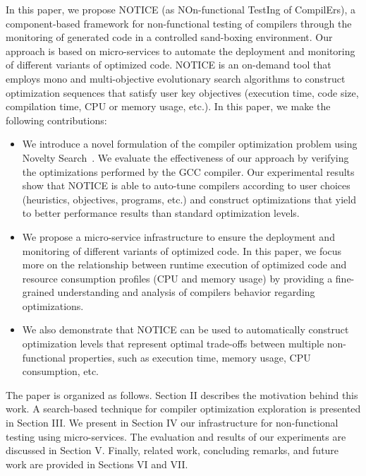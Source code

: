 In this paper, we propose NOTICE (as NOn-functional TestIng of CompilErs), a component-based framework for non-functional testing of compilers through the monitoring of generated code in a controlled sand-boxing environment. Our approach is based on micro-services to automate the deployment and monitoring of different variants of optimized code. NOTICE is an on-demand tool that employs mono and multi-objective evolutionary search algorithms to construct optimization sequences that satisfy user key objectives (execution time, code size, compilation time, CPU or memory usage, etc.).
In this paper, we make the following contributions:
\begin{itemize} 
	
	\item We introduce a novel formulation of the compiler optimization problem using Novelty Search~\cite{lehman2008exploiting}. We evaluate the effectiveness of our approach by verifying the optimizations performed by the GCC compiler.
	Our experimental results show that NOTICE is able to auto-tune compilers according to user choices (heuristics, objectives, programs, etc.) and construct optimizations that yield to better performance results than standard optimization levels.
	
	\item We propose a micro-service infrastructure to ensure the deployment and monitoring of different variants of optimized code. In this paper, we focus more on the relationship between runtime execution of optimized code and resource consumption profiles (CPU and memory usage) by providing a fine-grained understanding and analysis of compilers behavior regarding optimizations.
	
	\item We also demonstrate that NOTICE can be used to automatically construct optimization levels that represent optimal trade-offs between multiple non-functional properties, such as execution time, memory usage, CPU consumption, etc.
\end{itemize}






The paper is organized as follows. Section II describes the motivation behind this work. A search-based technique for compiler optimization exploration is presented in Section III. We present in Section IV our infrastructure for non-functional testing using micro-services. The evaluation and results of our experiments are discussed in Section V. Finally, related work, concluding remarks, and future work are provided in Sections VI and VII\@.


